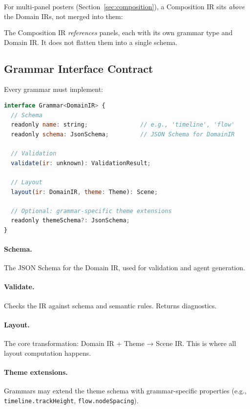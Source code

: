 For multi-panel posters (Section~\ref{sec:composition}), a Composition IR sits \emph{above} the Domain IRs, not merged into them:


The Composition IR \emph{references} panels, each with its own grammar type and Domain IR. It does not flatten them into a single schema.

\subsection{Grammar Interface Contract}

Every grammar must implement:

\begin{lstlisting}[language=javascript,caption={Grammar interface contract}]
interface Grammar<DomainIR> {
  // Schema
  readonly name: string;               // e.g., 'timeline', 'flow'
  readonly schema: JsonSchema;         // JSON Schema for DomainIR
  
  // Validation
  validate(ir: unknown): ValidationResult;
  
  // Layout
  layout(ir: DomainIR, theme: Theme): Scene;
  
  // Optional: grammar-specific theme extensions
  readonly themeSchema?: JsonSchema;
}
\end{lstlisting}

\paragraph{Schema.}
The JSON Schema for the Domain IR, used for validation and agent generation.

\paragraph{Validate.}
Checks the IR against schema and semantic rules. Returns diagnostics.

\paragraph{Layout.}
The core transformation: Domain IR + Theme → Scene IR. This is where all layout computation happens.

\paragraph{Theme extensions.}
Grammars may extend the theme schema with grammar-specific properties (e.g., \texttt{timeline.trackHeight}, \texttt{flow.nodeSpacing}).

